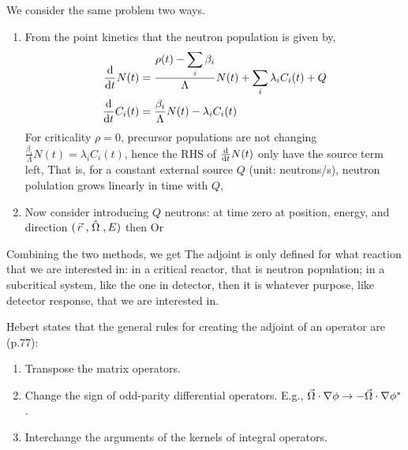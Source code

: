 \documentclass{school-22.211-notes}
\begin{document}
\clearpage
{}
We consider the same problem two ways.
\begin{enumerate}
\item From the point kinetics that the neutron population is given by, 
\begin{align}
  \frac{\mathrm{d}}{\mathrm{d}t} N(t) &= \frac{\rho(t) - \displaystyle\sum_i \beta_i}{\Lambda} N(t) + \displaystyle\sum_i \lambda_i C_i(t) + Q \\
  \frac{\mathrm{d}}{\mathrm{d}t} C_i (t) &= \frac{\beta_i}{\Lambda} N(t) - \lambda_i C_i (t)
\end{align}
For criticality $\rho=0$, precursor populations are not changing $\frac{\beta_i}{\Lambda}N(t) = \lambda_i C_i(t)$, hence the RHS of $\frac{\mathrm{d}}{\mathrm{d}t} N(t)$ only have the source term left, 
That is, for a constant external source $Q$ (unit: neutrons/s), neutron polulation grows linearly in time with $Q$,

\item Now consider introducing $Q$ neutrons: at time zero at position, energy, and direction $(\left.\vec{r}\right., \left. \hat{\Omega} \right., E)$ then
Or 
\end{enumerate}

Combining the two methods, we get
 The adjoint is only defined for what reaction that we are interested in: in a critical reactor, that is neutron population; in a subcritical system, like the one in detector, then it is whatever purpose, like detector response, that we are interested in. 


\clearpage
{}
Hebert states that the general rules for creating the adjoint of an operator are (p.77): 
\begin{enumerate}
\item Transpose the matrix operators. 
\item Change the sign of odd-parity differential operators. E.g., $\vec{\Omega} \cdot \nabla \phi \to - \vec{\Omega} \cdot \nabla \phi^*$. 
\item Interchange the arguments of the kernels of integral operators. 
\end{enumerate}
\end{document}
